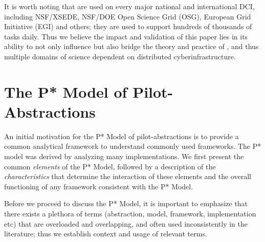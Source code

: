 \documentclass[conference]{IEEEtran}
\begin{document}
It is worth noting that \pilotjobs are used on every major national
and international DCI, including NSF/XSEDE, NSF/DOE Open Science Grid
(OSG), European Grid Initiative (EGI) and others; they are used to
support hundreds of thousands of tasks daily. Thus we believe the
impact and validation of this paper lies in its ability to not only
influence but also bridge the theory and practice of \pilotjobs, and
thus multiple domains of science dependent on distributed
cyberinfrastructure.






\section{The P* Model of Pilot-\\Abstractions}
\label{sec:pilot-model}

An initial motivation for the P* Model of pilot-abstractions is to
provide a common analytical framework to understand commonly
used \pilotjob frameworks.  The P* model was derived by analyzing many
\pilotjob implementations.  We first present
the common {\it elements} of the P* Model, followed by a description
of the {\it characteristics} that determine the interaction of these
elements and the overall functioning of any \pilotjob framework 
consistent with the P* Model.  

Before we proceed to discuss the P* Model, it is important to
emphasize that there exists a plethora of terms (abstraction,
model, framework, implementation etc) that are overloaded and
overlapping, and often used inconsistently in the literature;
thus we establish context and usage of relevant terms.
\end{document}
